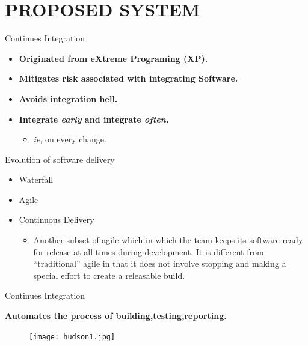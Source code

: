 \documentclass{beamer}
\begin{document}
\section{PROPOSED SYSTEM}  

\begin{frame}{Continues Integration}
\vspace{0.5cm}
 \begin{itemize}
\item \textbf{Originated from eXtreme Programing (XP).}
\vspace{.5 cm}
\item \textbf{Mitigates risk associated with integrating Software.} 
\vspace{.5 cm}
\item\textbf{Avoids integration hell.}

\vspace{.5 cm}
\item \textbf{Integrate \textit{early} and integrate \textit{often}.}
\vspace{.5 cm}
 \begin{itemize}
\item \textit{ie}, on every change.
\end{itemize}
\end{itemize}
\end{frame}  

\begin{frame}{Evolution of software delivery}
	\begin{itemize}
		\item Waterfall 
		\item Agile
		\item Continuous Delivery
		\begin{itemize}
			\item Another subset of agile which in which the team keeps its software ready for release at all times during development. It is different from “traditional” agile in that it does not involve stopping and making a special effort to create a releasable build.
		\end{itemize}
		\end{itemize}
\end{frame}

\begin{frame}{Continues Integration}

 \textbf {Automates the process of building,testing,reporting.}
\begin{figure}
\begin{center}
\texttt{[image: hudson1.jpg]}
\end{center}
\end{figure}
\end{frame}
\end{document}
